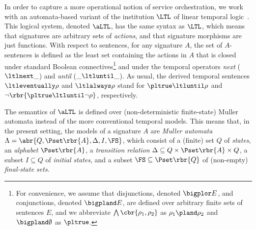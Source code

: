 \documentclass{LMCS}
\begin{document}
In order to capture a more operational notion of service orchestration, we work with an automata-based variant of the institution \(\LTL\) of linear temporal logic~\cite{Fiadeiro-Costa:A-duality-between-specifications-and-models-of-process-behaviour-1996}.  This logical system, denoted \(\aLTL\), has the same syntax as \(\LTL\), which means that signatures are arbitrary sets of \emph{actions}, and that signature morphisms are just functions.  With respect to sentences, for any signature \(A\), the set of \(A\)\nb-sentences is defined as the least set containing the actions in \(A\) that is closed under standard Boolean connectives\footnote{For convenience, we assume that disjunctions, denoted \(\bigplor E\), and conjunctions, denoted \(\bigpland E\), are defined over arbitrary finite sets of sentences \(E\), and we abbreviate \(\bigwedge \cbr{\rho_{1}, \rho_{2}}\) as \(\rho_{1} \pland \rho_{2}\) and \(\bigpland \emptyset\) as \(\pltrue\).} and under the temporal operators \emph{next} (\(\ltlnext \_\)) and \emph{until} (\(\_ \ltluntil \_\)).
As usual, the derived temporal sentences \(\ltleventually \rho\) and \(\ltlalways \rho\) stand for \(\pltrue \ltluntil \rho\) and \(\lnot \rbr{\pltrue \ltluntil \lnot \rho}\), respectively.

{\sloppy The semantics of \(\aLTL\) is defined over (non-deterministic
  finite-state) Muller automata \cite{Muller:Infinite-sequences-and-finite-machines-1963} instead of the more conventional temporal models.  This means that, in the present setting, the models of a signature \(A\) are \emph{Muller automata} \(\Lambda = \abr{Q, \Pset\rbr{A}, \Delta, I, \FS}\), which consist of a (finite) set \(Q\) of \emph{states}, an \emph{alphabet} \(\Pset\rbr{A}\), a \emph{transition relation} \(\Delta \subseteq Q \times \Pset\rbr{A} \times Q\), a subset \(I \subseteq Q\) of \emph{initial states}, and a subset \(\FS \subseteq \Pset\rbr{Q}\) of (non-empty) \emph{final-state sets}.}
\end{document}
